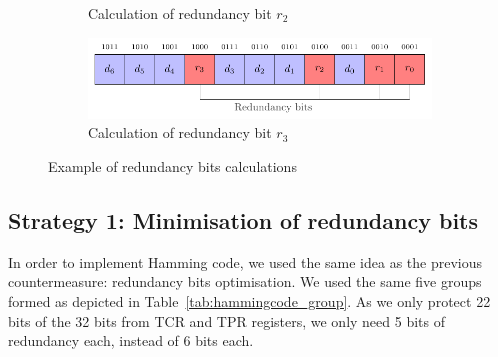 \begin{figure}[ht]
\begin{subfigure}[b]{0.49\textwidth}
        \caption{Calculation of redundancy bit $r_2$}
        \label{fig:hamming_code_example_4}
    \end{subfigure}
    \hfill
    \begin{subfigure}[b]{0.49\textwidth}
        \includegraphics[width=\textwidth, page=10]{c5_countermeasures_dift/img/hamming_bit.pdf}
        \caption{Calculation of redundancy bit $r_3$}
        \label{fig:hamming_code_example_5}
    \end{subfigure}
    \caption{Example of redundancy bits calculations}
    \label{fig:hamming_code_example}
\end{figure}

\subsection{Strategy 1: Minimisation of redundancy bits}

In order to implement Hamming code, we used the same idea as the previous countermeasure: redundancy bits optimisation. We used the same five groups formed as depicted in Table~\ref{tab:hammingcode_group}. As we only protect 22 bits of the 32 bits from TCR and TPR registers, we only need 5 bits of redundancy each, instead of 6 bits each.

